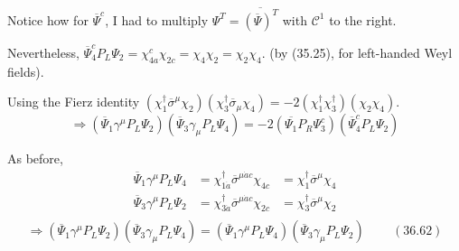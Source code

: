 \documentclass[twoside]{amsart}
\begin{document}
\begin{itemize}
Notice how for $\overline{\Psi}^c$, I had to multiply $\Psi^T = \overline{(\overline{\Psi})^T}$ with $\mathcal{C}^1$ to the right.  

Nevertheless, $\overline{\Psi}^c_4 P_L \Psi_2 = \chi_{4a}^c \chi_{2c} = \chi_4 \chi_2 =\chi_2 \chi_4$.  (by (35.25), for left-handed Weyl fields).  

Using the Fierz identity $(\chi_1^{\dag} \overline{\sigma}^{\mu} \chi_2)(\chi_3^{\dag} \overline{\sigma}_{\mu} \chi_4) = -2 (\chi_1^{\dag} \chi_3^{\dag})(\chi_2 \chi_4)$.  
\[
\Longrightarrow (\overline{\Psi}_1 \gamma^{\mu} P_L \Psi_2)(\overline{\Psi}_3 \gamma_{\mu} P_L \Psi_4) = -2( \overline{\Psi_1} P_R \Psi_3^c)(\overline{\Psi}_4^c P_L \Psi_2 )
\]

As before,
\[
\begin{aligned}
  \overline{\Psi}_1 \gamma^{\mu} P_L \Psi_4 & = \chi_{1\dot{a}}^{\dag} \overline{\sigma}^{\mu \dot{a}c} \chi_{4c} & = \chi_1^{\dag} \overline{\sigma}^{\mu} \chi_4 \\ 
  \overline{\Psi}_3 \gamma^{\mu} P_L \Psi_2 & = \chi_{3\dot{a}}^{\dag} \overline{\sigma}^{\mu \dot{a}c} \chi_{2c} & = \chi_3^{\dag} \overline{\sigma}^{\mu} \chi_2 \\ 
\end{aligned}
\]
\[
\Longrightarrow (\overline{\Psi}_1 \gamma^{\mu} P_L \Psi_2 )( \overline{\Psi}_3 \gamma_{\mu} P_L \Psi_4) = (\overline{\Psi}_1 \gamma^{\mu} P_L \Psi_4 )(\overline{\Psi}_3 \gamma_{\mu} P_L \Psi_2 )  \quad \quad \, (36.62)
\]


\end{itemize}
\end{document}
